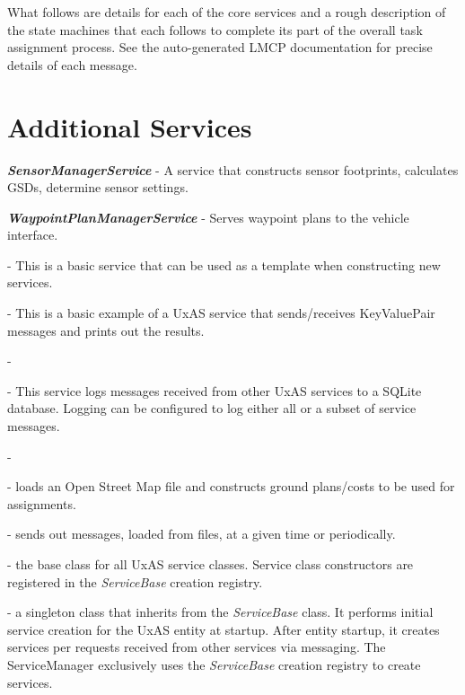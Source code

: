 What follows are details for each of the core services and a rough description of the state machines
that each follows to complete its part of the overall task assignment process. See the auto-generated
LMCP documentation for precise details of each message.





\section{Additional Services}
\begin{description}
\item
  \textbf{\textit{SensorManagerService}} - A service that constructs
  sensor footprints, calculates GSDs, determine sensor settings.
\item
  \textbf{\textit{WaypointPlanManagerService}} - Serves waypoint plans to
  the vehicle interface.
	\item[\textbf{\textit{00\_ServiceTemplate}}] - This is a basic service that can be used as a template when constructing new services.
	\item[\textbf{\textit{01\_HelloWorld}}] - This is a basic example of a UxAS service that sends/receives KeyValuePair messages and prints out the results.
	\item[\textbf{\textit{BatchSummaryService}}] - 
	\item[\textbf{\textit{MessageLoggerDataService}}] - This service logs messages received from other UxAS services to a SQLite database.  Logging can be configured to log either all or a subset of service messages.
	\item[\textbf{\textit{OperatingRegionStateService}}] - 
	\item[\textbf{\textit{OsmPlannerService}}] - loads an Open Street Map file and constructs ground plans/costs to be used for assignments.
	\item[\textbf{\textit{SendMessagesService}}] - sends out messages, loaded from files, at a given time or periodically.
	\item[\textbf{\textit{ServiceBase}}] - the base class for all UxAS service classes. Service class constructors are registered in the \textit{ServiceBase} creation registry.
	\item[\textbf{\textit{ServiceManager}}] - a singleton class that inherits from the  \textit{ServiceBase}  class. It performs initial service creation for the UxAS entity at startup. After entity startup, it creates services per requests received from other services via messaging.  The ServiceManager  exclusively uses the  \textit{ServiceBase} creation registry to create services.
\end{description}


